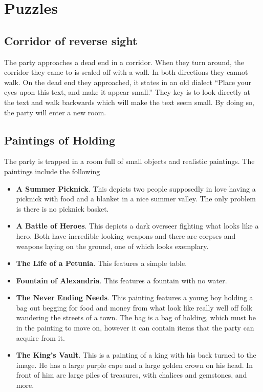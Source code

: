 \section{Puzzles}

\subsection{Corridor of reverse sight}

The party approaches a dead end in a corridor. When they turn around, the corridor they came to is sealed off with a wall. In both directions they cannot walk. On the dead end they approached, it states in an old dialect ``Place your eyes upon this text, and make it appear small.'' They key is to look directly at the text and walk backwards which will make the text seem small. By doing so, the party will enter a new room.


\subsection{Paintings of Holding}

The party is trapped in a room full of small objects and realistic paintings. The paintings include the following

\begin{itemize}
	\item \textbf{A Summer Picknick}. This depicts two people supposedly in love having a picknick with food and a blanket in a nice summer valley. The only problem is there is no picknick basket.
	\item \textbf{A Battle of Heroes}. This depicts a dark overseer fighting what looks like a hero. Both have incredible looking weapons and there are corpses and weapons laying on the ground, one of which looks exemplary.
	\item \textbf{The Life of a Petunia}. This features a simple table.
	\item \textbf{Fountain of Alexandria}. This features a fountain with no water.
	\item \textbf{The Never Ending Needs}. This painting features a young boy holding a bag out begging for food and money from what look like really well off folk wandering the streets of a town. The bag is a bag of holding, which must be in the painting to move on, however it can contain items that the party can acquire from it.
	\item \textbf{The King's Vault}. This is a painting of a king with his back turned to the image. He has a large purple cape and a large golden crown on his head. In front of him are large piles of treasures, with chalices and gemstones, and more.
\end{itemize}

